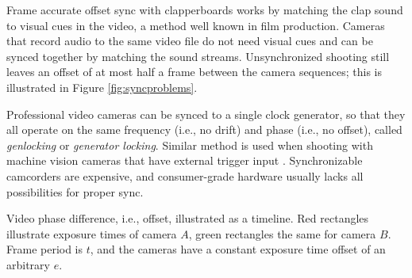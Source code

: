 Frame accurate offset sync with clapperboards works by matching the clap sound to visual cues in the video, a method well known in film production.
Cameras that record audio to the same video file do not need visual cues and can be synced together by matching the sound streams.
Unsynchronized shooting still leaves an offset of at most half a frame between the camera sequences; this is illustrated in Figure \ref{fig:syncproblems}.

Professional video cameras can be synced to a single clock generator, so that they all operate on the same frequency (i.e., no drift) and phase (i.e., no offset), called \emph{genlocking} or \emph{generator locking}.
Similar method is used when shooting with machine vision cameras that have external trigger input \cite{poynton1996technical}.
Synchronizable camcorders are expensive, and consumer-grade hardware usually lacks all possibilities for proper sync.

%
%
%
%


{Video phase difference, i.e., offset, illustrated as a timeline.
Red rectangles illustrate exposure times of camera $A$, green rectangles the same for camera $B$.
Frame period is $t$, and the cameras have a constant exposure time offset of an arbitrary $e$.}

